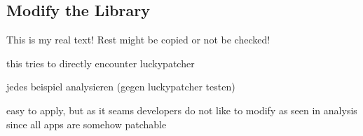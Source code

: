 \subsection{Modify the Library} \label{subsection:evaluation-modifications-library}
This is my real text! Rest might be copied or not be checked!

this tries to directly encounter luckypatcher

jedes beispiel analysieren (gegen luckypatcher testen)


easy to apply, but as it seams developers do not like to modify as seen in analysis since all apps are somehow patchable
